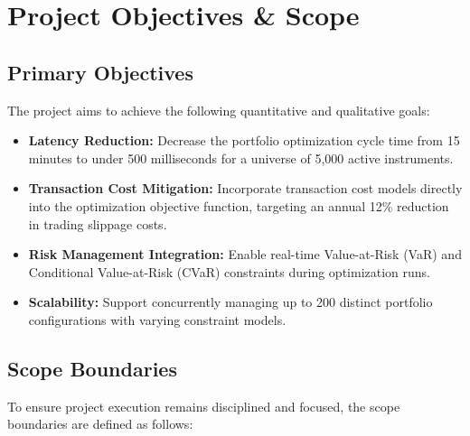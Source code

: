 \section{Project Objectives \& Scope}

\subsection{Primary Objectives}
The project aims to achieve the following quantitative and qualitative goals:
\begin{itemize}
  \item \textbf{Latency Reduction:} Decrease the portfolio optimization cycle time from 15 minutes to under 500 milliseconds for a universe of 5,000 active instruments.
  \item \textbf{Transaction Cost Mitigation:} Incorporate transaction cost models directly into the optimization objective function, targeting an annual 12\% reduction in trading slippage costs.
  \item \textbf{Risk Management Integration:} Enable real-time Value-at-Risk (VaR) and Conditional Value-at-Risk (CVaR) constraints during optimization runs.
  \item \textbf{Scalability:} Support concurrently managing up to 200 distinct portfolio configurations with varying constraint models.
\end{itemize}

\subsection{Scope Boundaries}
To ensure project execution remains disciplined and focused, the scope boundaries are defined as follows:

